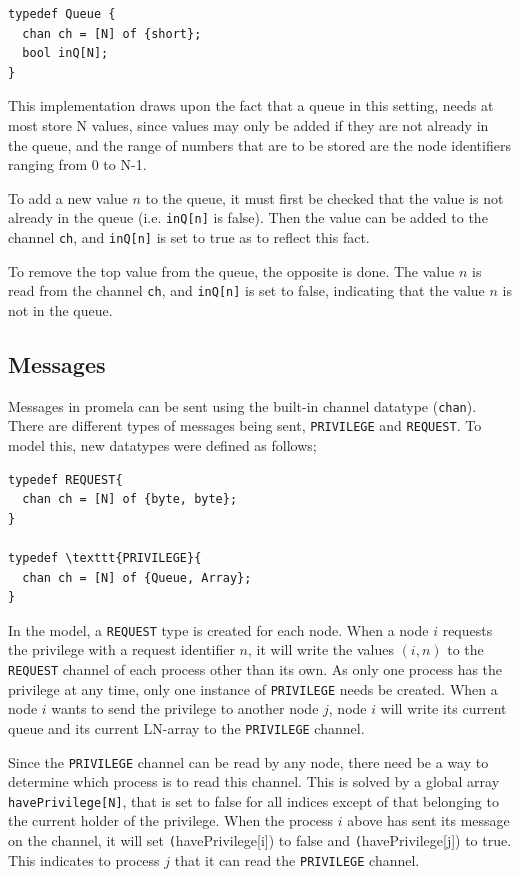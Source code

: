 \documentclass[a4paper,10pt]{llncs}
\begin{document}
\begin{lstlisting}
typedef Queue {
  chan ch = [N] of {short};
  bool inQ[N];
}
\end{lstlisting}

This implementation draws upon the fact that a queue in this setting, needs at most store N values, since values may only be added if they are not already in the queue, and the range of numbers that are to be stored are the node identifiers ranging from 0 to N-1.

To add a new value $n$ to the queue, it must first be checked that the value is not already in the queue (i.e. \texttt{inQ[n]} is false). Then the value can be added to the channel \texttt{ch}, and \texttt{inQ[n]} is set to true as to reflect this fact.

To remove the top value from the queue, the opposite is done. The value $n$ is read from the channel \texttt{ch}, and \texttt{inQ[n]} is set to false, indicating that the value $n$ is not in the queue.

\subsection{Messages}
Messages in promela can be sent using the built-in channel datatype (\texttt{chan}). There are different types of messages being sent, \texttt{PRIVILEGE} and \texttt{REQUEST}. To model this, new datatypes were defined as follows;

\begin{lstlisting}
typedef REQUEST{
  chan ch = [N] of {byte, byte};
}

typedef \texttt{PRIVILEGE}{
  chan ch = [N] of {Queue, Array};
}
\end{lstlisting}


In the model, a \texttt{REQUEST} type is created for each node. When a node $i$ requests the privilege with a request identifier $n$, it will write the values $(i,n)$ to the \texttt{REQUEST} channel of each process other than its own. As only one process has the privilege at any time, only one instance of \texttt{PRIVILEGE} needs be created. When a node $i$ wants to send the privilege to another node $j$, node $i$ will write its current queue and its current LN-array to the \texttt{PRIVILEGE} channel.

Since the \texttt{PRIVILEGE} channel can be read by any node, there need be a way to determine which process is to read this channel. This is solved by a global array \texttt{havePrivilege[N]}, that is set to false for all indices except of that belonging to the current holder of the privilege. When the process $i$ above has sent its message on the channel, it will set \texttt (havePrivilege[i]) to false and \texttt (havePrivilege[j]) to true. This indicates to process $j$ that it can read the \texttt{PRIVILEGE} channel.
\end{document}
